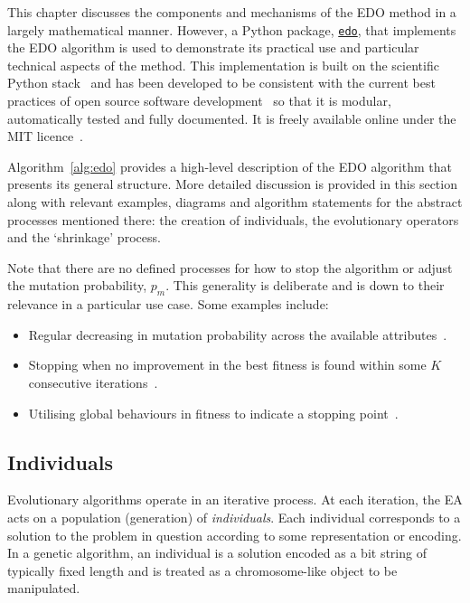 This chapter discusses the components and mechanisms of the EDO method in a
largely mathematical manner. However, a Python package,
\href{https://github.com/daffidwilde/edo}{\texttt{edo}}, that
implements the EDO algorithm is used to demonstrate its practical use and
particular technical aspects of the method. This implementation is built on the
scientific Python stack~\cite{pandas,numpy} and has been developed to be
consistent with the current best practices of open source software
development~\cite{Jimenez2017} so that it is modular, automatically tested and
fully documented. It is freely available online under the MIT
licence~\cite{edo-project}.

Algorithm~\ref{alg:edo} provides a high-level description of the EDO algorithm
that presents its general structure. More detailed discussion is provided in
this section along with relevant examples, diagrams and algorithm statements for
the abstract processes mentioned there: the creation of individuals, the
evolutionary operators and the `shrinkage' process.


Note that there are no defined processes for how to stop the
algorithm or adjust the mutation probability, \(p_m\). This generality is
deliberate and is down to their relevance in a particular use case. Some
examples include:
\begin{itemize}
    \item Regular decreasing in mutation probability across the available
        attributes~\cite{Kuehn2013}.
    \item Stopping when no improvement in the best fitness is found within some
        \(K\) consecutive iterations~\cite{Leung2001}.
    \item Utilising global behaviours in fitness to indicate a stopping
        point~\cite{Marti2016}.
\end{itemize}


\subsection{Individuals}

Evolutionary algorithms operate in an iterative process. At each iteration, the
EA acts on a population (generation) of \emph{individuals}. Each individual
corresponds to a solution to the problem in question according to some
representation or encoding. In a genetic algorithm, an individual is a solution
encoded as a bit string of typically fixed length and is treated as a
chromosome-like object to be manipulated.

